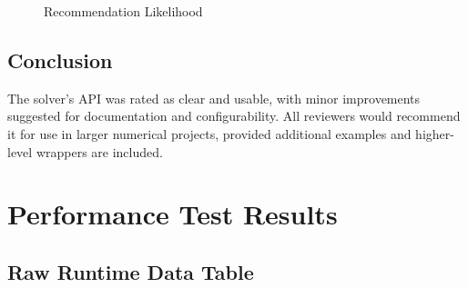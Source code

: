\documentclass[12pt, titlepage]{article}
\begin{document}
\begin{figure}[H]
  \centering
  \caption{Recommendation Likelihood}
\end{figure}

\subsection{Conclusion}

The solver's API was rated as clear and usable, with minor improvements
suggested for documentation and configurability. All reviewers would recommend
it for use in larger numerical projects, provided additional examples and
higher-level wrappers are included.

\newpage{}

\section{Performance Test Results}
\label{sec:perf-test-results}

\subsection{Raw Runtime Data Table}
\end{document}

